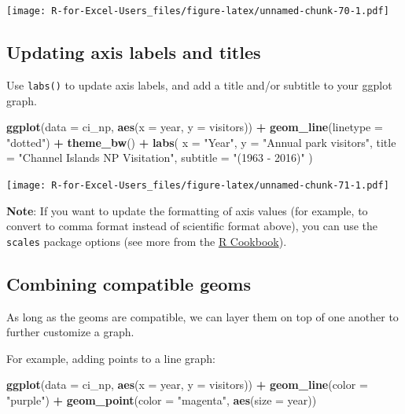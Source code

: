 \documentclass[]{book}
\newenvironment{Shaded}{\begin{snugshade}}{\end{snugshade}}
\newcommand{\DataTypeTok}[1]{\textcolor[rgb]{0.13,0.29,0.53}{#1}}
\newcommand{\KeywordTok}[1]{\textcolor[rgb]{0.13,0.29,0.53}{\textbf{#1}}}
\newcommand{\NormalTok}[1]{#1}
\newcommand{\OperatorTok}[1]{\textcolor[rgb]{0.81,0.36,0.00}{\textbf{#1}}}
\newcommand{\StringTok}[1]{\textcolor[rgb]{0.31,0.60,0.02}{#1}}
\begin{document}
\texttt{[image: R-for-Excel-Users\_files/figure-latex/unnamed-chunk-70-1.pdf]}

\hypertarget{updating-axis-labels-and-titles}{%
\subsection{Updating axis labels and titles}\label{updating-axis-labels-and-titles}}

Use \texttt{labs()} to update axis labels, and add a title and/or subtitle to your ggplot graph.

\begin{Shaded}
\begin{Highlighting}[]
\KeywordTok{ggplot}\NormalTok{(}\DataTypeTok{data =}\NormalTok{ ci_np, }\KeywordTok{aes}\NormalTok{(}\DataTypeTok{x =}\NormalTok{ year, }\DataTypeTok{y =}\NormalTok{ visitors)) }\OperatorTok{+}
\StringTok{  }\KeywordTok{geom_line}\NormalTok{(}\DataTypeTok{linetype =} \StringTok{"dotted"}\NormalTok{) }\OperatorTok{+}
\StringTok{  }\KeywordTok{theme_bw}\NormalTok{() }\OperatorTok{+}
\StringTok{  }\KeywordTok{labs}\NormalTok{(}
    \DataTypeTok{x =} \StringTok{"Year"}\NormalTok{,}
    \DataTypeTok{y =} \StringTok{"Annual park visitors"}\NormalTok{,}
    \DataTypeTok{title =} \StringTok{"Channel Islands NP Visitation"}\NormalTok{,}
    \DataTypeTok{subtitle =} \StringTok{"(1963 - 2016)"}
\NormalTok{  )}
\end{Highlighting}
\end{Shaded}

\texttt{[image: R-for-Excel-Users\_files/figure-latex/unnamed-chunk-71-1.pdf]}

\textbf{Note}: If you want to update the formatting of axis values (for example, to convert to comma format instead of scientific format above), you can use the \texttt{scales} package options (see more from the \href{http://www.cookbook-r.com/Graphs/Axes_(ggplot2)/}{R Cookbook}).

\hypertarget{combining-compatible-geoms}{%
\subsection{Combining compatible geoms}\label{combining-compatible-geoms}}

As long as the geoms are compatible, we can layer them on top of one another to further customize a graph.

For example, adding points to a line graph:

\begin{Shaded}
\begin{Highlighting}[]
\KeywordTok{ggplot}\NormalTok{(}\DataTypeTok{data =}\NormalTok{ ci_np, }\KeywordTok{aes}\NormalTok{(}\DataTypeTok{x =}\NormalTok{ year, }\DataTypeTok{y =}\NormalTok{ visitors)) }\OperatorTok{+}
\StringTok{  }\KeywordTok{geom_line}\NormalTok{(}\DataTypeTok{color =} \StringTok{"purple"}\NormalTok{) }\OperatorTok{+}
\StringTok{  }\KeywordTok{geom_point}\NormalTok{(}\DataTypeTok{color =} \StringTok{"magenta"}\NormalTok{,}
             \KeywordTok{aes}\NormalTok{(}\DataTypeTok{size =}\NormalTok{ year))}
\end{Highlighting}
\end{Shaded}
\end{document}
